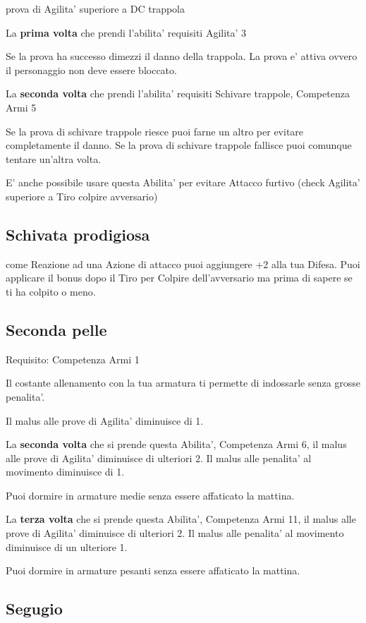 \documentclass[a4paper,11pt,twoside,openany]{book}
\begin{document}
prova di Agilita' superiore a DC trappola

La \textbf{prima volta} che prendi l'abilita' requisiti Agilita' 3

Se la prova ha successo dimezzi il danno della trappola. La prova e' attiva ovvero il personaggio non deve essere bloccato.

La \textbf{seconda volta} che prendi l'abilita' requisiti Schivare trappole, Competenza Armi 5

Se la prova di schivare trappole riesce puoi farne un altro per evitare completamente il danno. Se la prova di schivare trappole fallisce puoi comunque tentare un'altra volta.

E' anche possibile usare questa Abilita' per evitare Attacco furtivo (check Agilita' superiore a Tiro colpire avversario)

\subsection{Schivata prodigiosa}

come Reazione ad una Azione di attacco puoi aggiungere +2 alla tua Difesa. Puoi applicare il bonus dopo il Tiro per Colpire dell'avversario ma prima di sapere se ti ha colpito o meno.

\subsection{Seconda pelle}

Requisito: Competenza Armi 1

Il costante allenamento con la tua armatura ti permette di indossarle senza grosse penalita'.

Il malus alle prove di Agilita' diminuisce di 1.

La \textbf{seconda volta} che si prende questa Abilita', Competenza Armi 6, il malus alle prove di Agilita' diminuisce di ulteriori 2. 
Il malus alle penalita' al movimento diminuisce di 1.

Puoi dormire in armature medie senza essere affaticato la mattina.

La \textbf{terza volta} che si prende questa Abilita', Competenza Armi 11, il malus alle prove di Agilita' diminuisce di ulteriori 2. Il malus alle penalita' al movimento diminuisce di un ulteriore 1. 

Puoi dormire in armature pesanti senza essere affaticato la mattina.

\subsection{Segugio}
\end{document}
